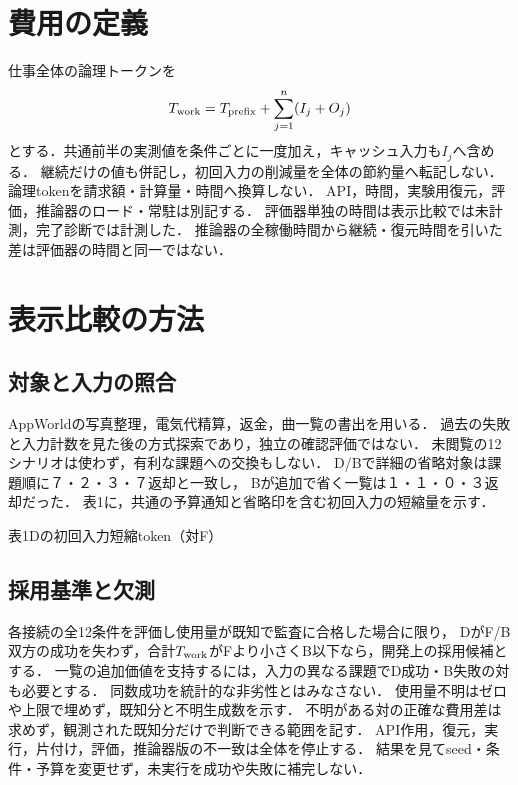 \documentclass[letter]{ieicej}
\begin{document}
\section{費用の定義}
仕事全体の論理トークンを
\begin{equation}
 T_{\rm work}=T_{\rm prefix}+\sum_{j=1}^{n}(I_j+O_j)
\end{equation}
とする．共通前半の実測値を条件ごとに一度加え，キャッシュ入力も$I_j$へ含める．
継続だけの値も併記し，初回入力の削減量を全体の節約量へ転記しない．
論理tokenを請求額・計算量・時間へ換算しない．
API，時間，実験用復元，評価，推論器のロード・常駐は別記する．
評価器単独の時間は表示比較では未計測，完了診断では計測した．
推論器の全稼働時間から継続・復元時間を引いた差は評価器の時間と同一ではない．

\section{表示比較の方法}



\subsection{対象と入力の照合}
AppWorld\cite{appworld}の写真整理，電気代精算，返金，曲一覧の書出を用いる．
過去の失敗と入力計数を見た後の方式探索であり，独立の確認評価ではない．
未閲覧の12シナリオは使わず，有利な課題への交換もしない．
D/Bで詳細の省略対象は課題順に７・２・３・７返却と一致し，
Bが追加で省く一覧は１・１・０・３返却だった．
表1に，共通の予算通知と省略印を含む初回入力の短縮量を示す．

\begin{center}\begin{minipage}{\columnwidth}\centering
\small 表1\quad Dの初回入力短縮token（対F）\par\smallskip
\PublicDisplayInitialSavings
\end{minipage}\end{center}

\subsection{採用基準と欠測}
各接続の全12条件を評価し使用量が既知で監査に合格した場合に限り，
DがF/B双方の成功を失わず，合計$T_{\rm work}$がFより小さくB以下なら，開発上の採用候補とする．
一覧の追加価値を支持するには，入力の異なる課題でD成功・B失敗の対も必要とする．
同数成功を統計的な非劣性とはみなさない．
使用量不明はゼロや上限で埋めず，既知分と不明生成数を示す．
不明がある対の正確な費用差は求めず，観測された既知分だけで判断できる範囲を記す．
API作用，復元，実行，片付け，評価，推論器版の不一致は全体を停止する．
結果を見てseed・条件・予算を変更せず，未実行を成功や失敗に補完しない．
\end{document}
